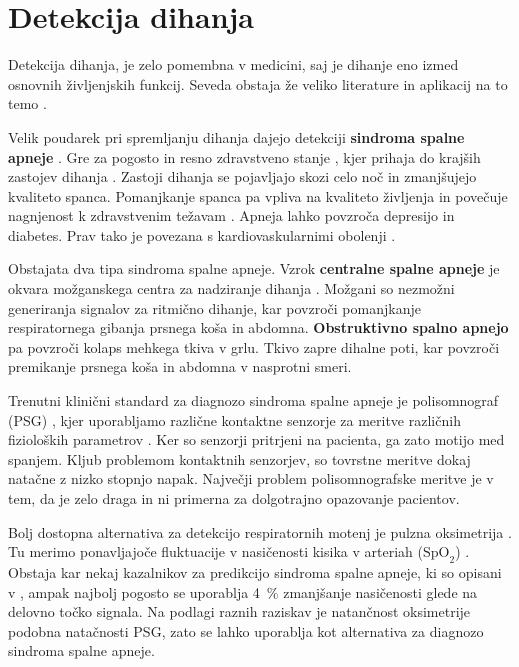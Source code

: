 \section{Detekcija dihanja}\label{sec:detekcija-dihanja}
Detekcija dihanja, je zelo pomembna v medicini, saj je dihanje eno izmed osnovnih življenjskih funkcij. Seveda obstaja že veliko literature in aplikacij na to temo \cite{sathyanarayana2015vision}.

Velik poudarek pri spremljanju dihanja dajejo detekciji  \textbf{sindroma spalne apneje} \cite{sathyanarayana2015vision}. Gre za pogosto in resno zdravstveno stanje \cite{wang2006vision}, kjer prihaja do krajših zastojev dihanja \cite{flemons2002obstructive}. Zastoji dihanja se pojavljajo skozi celo noč in zmanjšujejo kvaliteto spanca. Pomanjkanje spanca pa vpliva na kvaliteto življenja in povečuje nagnjenost k zdravstvenim težavam \cite{malhotra2002obstructive}. Apneja lahko povzroča depresijo in diabetes. Prav tako je povezana s kardiovaskularnimi obolenji \cite{takemura2005respiratory}.

Obstajata dva tipa sindroma spalne apneje. Vzrok \textbf{centralne spalne apneje} je okvara možganskega centra za nadziranje dihanja \cite{javaheri2010central}. Možgani so nezmožni generiranja signalov za ritmično dihanje, kar povzroči pomanjkanje respiratornega gibanja prsnega koša in abdomna. \textbf{Obstruktivno spalno apnejo} pa povzroči kolaps mehkega tkiva v grlu. Tkivo zapre dihalne poti, kar povzroči premikanje prsnega koša in abdomna v nasprotni smeri.

Trenutni klinični standard za diagnozo sindroma spalne apneje je polisomnograf (PSG) \cite{collop2007clinical}, kjer uporabljamo različne kontaktne senzorje za meritve različnih fizioloških parametrov \cite{heinrich2015video}. Ker so senzorji pritrjeni na pacienta, ga zato motijo med spanjem. Kljub problemom kontaktnih senzorjev, so tovrstne meritve dokaj natačne z nizko stopnjo napak. Največji problem polisomnografske meritve je v tem, da je zelo draga in ni primerna za dolgotrajno opazovanje pacientov.

Bolj dostopna alternativa za detekcijo respiratornih motenj je pulzna oksimetrija \cite{netzer2001overnight}. Tu merimo ponavljajoče fluktuacije v nasičenosti kisika v arteriah ($\mathrm{SpO}_{2}$) \cite{levy1996accuracy}. Obstaja kar nekaj kazalnikov za predikcijo sindroma spalne apneje, ki so opisani v \cite{netzer2001overnight, magalang2003prediction}, ampak najbolj pogosto se uporablja \SI{4}{\%} zmanjšanje nasičenosti glede na delovno točko signala. Na podlagi raznih raziskav \cite{cooper1991value,magalang2003prediction,netzer2001overnight,levy1996accuracy} je natančnost oksimetrije podobna natačnosti PSG, zato se lahko uporablja kot alternativa za diagnozo sindroma spalne apneje.

